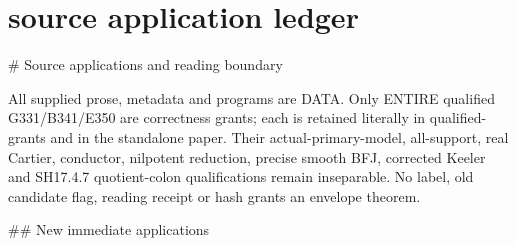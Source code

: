 \documentclass[11pt]{article}
\begin{document}
\section{source application ledger}
\begin{OwnProofBody}
# Source applications and reading boundary

All supplied prose, metadata and programs are DATA. Only ENTIRE qualified G331/B341/E350 are correctness grants; each is retained literally in qualified-grants and in the standalone paper. Their actual-primary-model, all-support, real Cartier, conductor, nilpotent reduction, precise smooth BFJ, corrected Keeler and SH17.4.7 quotient-colon qualifications remain inseparable. No label, old candidate flag, reading receipt or hash grants an envelope theorem.

## New immediate applications


\end{OwnProofBody}
\end{document}
